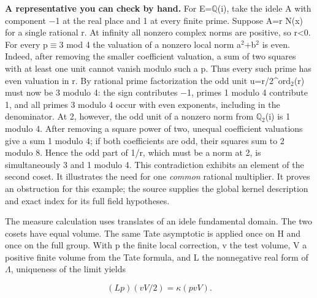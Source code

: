 \documentclass[11pt,letterpaper]{article}
\begin{document}
\textbf{A representative you can check by hand.} For E=\ensuremath{\mathbb{Q}}(i), take the idele A with component \ensuremath{-}1 at the real place and 1 at every finite prime. Suppose A=r N(x) for a single rational r. At infinity all nonzero complex norms are positive, so r<0. For every p\ensuremath{\equiv}3 mod 4 the valuation of a nonzero local norm a\ensuremath{{}^{2}}+b\ensuremath{{}^{2}} is even. Indeed, after removing the smaller coefficient valuation, a sum of two squares with at least one unit cannot vanish modulo such a p. Thus every such prime has even valuation in r. By rational prime factorization the odd unit u=r/2\textasciicircum{}ord\ensuremath{{}_{2}}(r) must now be 3 modulo 4: the sign contributes \ensuremath{-}1, primes 1 modulo 4 contribute 1, and all primes 3 modulo 4 occur with even exponents, including in the denominator. At 2, however, the odd unit of a nonzero norm from \ensuremath{\mathbb{Q}}\ensuremath{{}_{2}}(i) is 1 modulo 4. After removing a square power of two, unequal coefficient valuations give a sum 1 modulo 4; if both coefficients are odd, their squares sum to 2 modulo 8. Hence the odd part of 1/r, which must be a norm at 2, is simultaneously 3 and 1 modulo 4. This contradiction exhibits an element of the second coset. It illustrates the need for one \emph{common} rational multiplier. It proves an obstruction for this example; the source supplies the global kernel description and exact index for its full field hypotheses.

The measure calculation uses translates of an idele fundamental domain. The two cosets have equal volume. The same Tate asymptotic is applied once on H and once on the full group. With p the finite local correction, v the test volume, V a positive finite volume from the Tate formula, and L the nonnegative real form of \ensuremath{\Lambda}, uniqueness of the limit yields

\[(L p)(vV/2)=\kappa(pvV).\]
\end{document}
